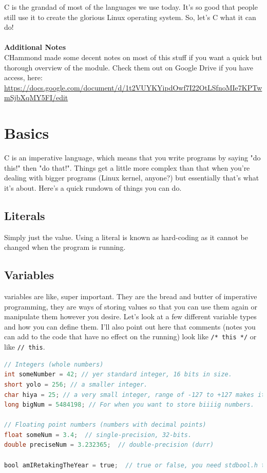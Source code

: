 C is the grandad of most of the languages we use today. It's so good that people still use it to create the glorious Linux operating system. So, let's C what it can do!
\\
\\
\textbf{Additional Notes}\\
CHammond made some decent notes on most of this stuff if you want a quick but thorough overview of the module. Check them out on Google Drive if you have access, here: \url{https://docs.google.com/document/d/1t2VUYKYipdOwf7I22OtLSfnoMIe7KPTwmSjbXqMY5FI/edit}

\section{Basics}
C is an \gls{imperative} language, which means that you write programs by saying "do this!" then "do that!". Things get a little more complex than that when you're dealing with bigger programs (Linux kernel, anyone?) but essentially that's what it's about. Here's a quick rundown of things you can do.

\subsection{Literals}
Simply just the value. Using a literal is known as hard-coding as it cannot be changed when the program is running.

\subsection{Variables}
\Glspl{variable} are like, super important. They are the bread and butter of imperative programming, they are ways of storing values so that you can use them again or manipulate them however you desire. Let's look at a few different variable types and how you can define them. I'll also point out here that comments (notes you can add to the code that have no effect on the running) look like \texttt{/* this */} or like \texttt{// this}.
\begin{lstlisting}[language=C]
// Integers (whole numbers)
int someNumber = 42; // yer standard integer, 16 bits in size.
short yolo = 256; // a smaller integer.
char hiya = 25; // a very small integer, range of -127 to +127 makes it awesome for text characters.
long bigNum = 5484198; // For when you want to store biiiig numbers.

// Floating point numbers (numbers with decimal points)
float someNum = 3.4;  // single-precision, 32-bits.
double preciseNum = 3.232365;  // double-precision (durr)

bool amIRetakingTheYear = true;  // true or false, you need stdbool.h though.
\end{lstlisting}

